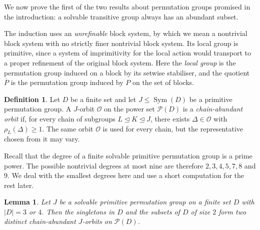 \documentclass[10pt]{amsart}
\newtheorem{lemma}[theorem]{Lemma}
\theoremstyle{definition}
\newtheorem{definition}[theorem]{Definition}
\renewcommand{\leq}{\leqslant}
\renewcommand{\geq}{\geqslant}
\newcommand{\pow}{\mathcal{P}}
\newcommand{\orbit}{\mathcal{O}}
\DeclareMathOperator{\Sym}{Sym}
\numberwithin{equation}{section}
\numberwithin{table}{section}
\begin{document}
We now prove the first of the two results about permutation groups promised in the
introduction: a solvable transitive group always has an abundant subset.

The induction uses an {\it unrefinable} block system, by which we mean a
nontrivial block system with no strictly finer nontrivial block system. Its local group is primitive, since a
system of imprimitivity for the local action would transport to a proper
refinement of the original block system. Here the {\it local group} is the permutation group induced on a block by
its setwise stabiliser, and the quotient $\overline{P}$ is the permutation group induced by $P$ on the set of blocks.

\begin{definition}\label{def:chain-label}
Let $D$ be a finite set and let $J\leq\Sym(D)$ be a primitive permutation
group. A $J$-orbit $\orbit$ on the power set $\pow(D)$ is a
{\it chain-abundant orbit} if, for every chain of subgroups
$L\trianglelefteq K\trianglelefteq J$, there exists
$\Delta\in\orbit$ with $\rho_L(\Delta)\geq1$. The same orbit $\orbit$ is
used for every chain, but the representative chosen from it may vary.
\end{definition}

Recall that the degree of a finite solvable primitive permutation group is a prime power. The possible nontrivial degrees at most nine are therefore $2,3,4,5,7,8$ and $9$. We deal with the smallest degrees here and use a short computation for the rest later.

\begin{lemma}\label{lem:deg34}
Let $J$ be a solvable primitive permutation group on a finite set $D$ with
$|D|=3$ or $4$. Then the singletons in $D$ and the subsets of $D$ of size $2$ form two
distinct chain-abundant $J$-orbits on $\pow(D)$.
\end{lemma}
\end{document}
